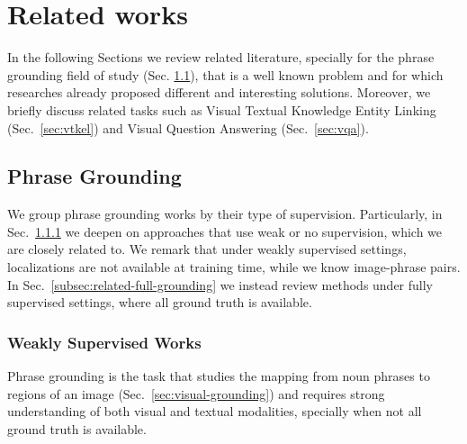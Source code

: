
\chapter{Related works}
\label{ch:related-works}

In the following Sections we review related literature, specially for
the phrase grounding field of study (Sec.
\ref{sec:related-grounding}), that is a well known problem and for
which researches already proposed different and interesting solutions.
Moreover, we briefly discuss related tasks such as Visual Textual
Knowledge Entity Linking (Sec.~\ref{sec:vtkel}) and Visual Question
Answering (Sec.~\ref{sec:vqa}).

\section{Phrase Grounding}
\label{sec:related-grounding}

We group phrase grounding works by their type of supervision.
Particularly, in Sec.~\ref{subsec:related-weak-grounding} we deepen on
approaches that use weak or no supervision, which we are closely
related to. We remark that under weakly supervised settings,
localizations are not available at training time, while we know
image-phrase pairs. In Sec.~\ref{subsec:related-full-grounding} we
instead review methods under fully supervised settings, where all
ground truth is available.

\subsection{Weakly Supervised Works}
\label{subsec:related-weak-grounding}

Phrase grounding is the task that studies the mapping from noun
phrases to regions of an image (Sec.~\ref{sec:visual-grounding}) and
requires strong understanding of both visual and textual modalities,
specially when not all ground truth is available. 

